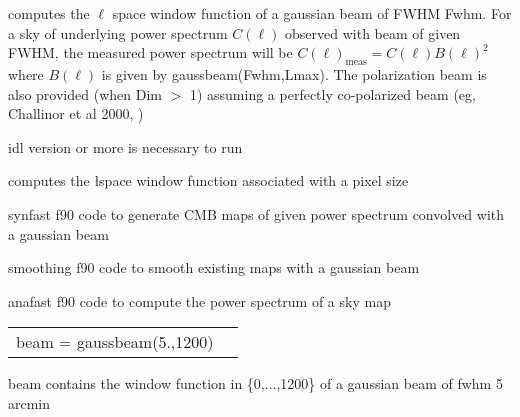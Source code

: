 
\begin{codedescription}
{\facname{} computes the $\ell$ space window function of a gaussian beam of FWHM
Fwhm. For a sky of underlying power spectrum $C(\ell)$ observed with beam of
given FWHM, the measured power spectrum will be $C(\ell)_{\mathrm{meas}} = C(\ell)
B(\ell)^2$ where $B(\ell)$ is given by gaussbeam(Fwhm,Lmax). The
polarization beam is also provided (when Dim $>$ 1) assuming a perfectly
co-polarized beam (eg, Challinor et al 2000, 
)}
\end{codedescription}



\begin{related}
  \begin{sulist}{} %
    \item[idl] version \idlversion or more is necessary to run \facname
    \item[\htmlref{healpixwindow}{idl:healpixwindow}] computes the \l space window function associated with
    a \healpix pixel size
    \item[synfast] f90 code to generate CMB maps of given power spectrum convolved with a gaussian beam
    \item[smoothing] f90 code to smooth existing \healpix maps with a gaussian beam
    \item[anafast] f90 code to compute the power spectrum of a \healpix sky map
  \end{sulist}
\end{related}

\begin{example}
{
\begin{tabular}{ll} %
beam = gaussbeam(5.,1200)
\end{tabular}
}
{
beam contains the window function in \{0,...,1200\} of a gaussian beam of fwhm 5 arcmin}
\end{example}


